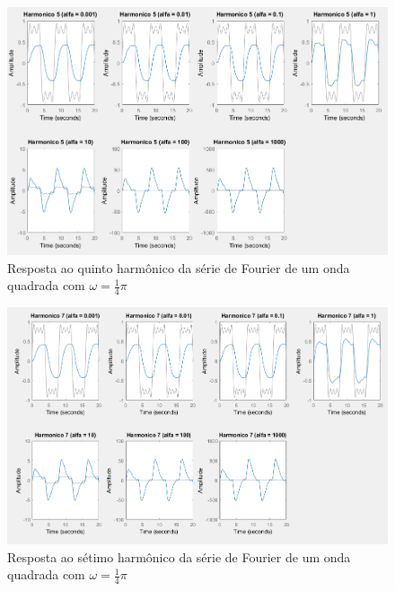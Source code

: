 \documentclass[a4paper, 12pt]{article}
\begin{document}
			\begin{figure}[!ht]
				\centering
				\includegraphics[scale=0.5]{img/3i_alfa.png}
				\caption{Resposta ao quinto harmônico da série de Fourier de um onda quadrada com $\omega = \frac{1}{4}\pi$}	
			\end{figure}		
			\begin{figure}[!ht]
				\centering
				\includegraphics[scale=0.57]{img/3j_alfa.png}
				\caption{Resposta ao sétimo harmônico da série de Fourier de um onda quadrada com $\omega = \frac{1}{4}\pi$}	
			\end{figure}	
			\clearpage		
\end{document}
